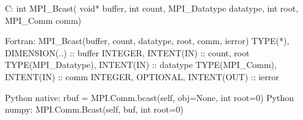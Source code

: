 C:
int MPI_Bcast(
    void* buffer, int count, MPI_Datatype datatype,
    int root, MPI_Comm comm)

Fortran:
MPI_Bcast(buffer, count, datatype, root, comm, ierror)
TYPE(*), DIMENSION(..) :: buffer
INTEGER, INTENT(IN) :: count, root
TYPE(MPI_Datatype), INTENT(IN) :: datatype
TYPE(MPI_Comm), INTENT(IN) :: comm
INTEGER, OPTIONAL, INTENT(OUT) :: ierror

Python native:
rbuf = MPI.Comm.bcast(self, obj=None, int root=0)
Python numpy:
MPI.Comm.Bcast(self, buf, int root=0)

